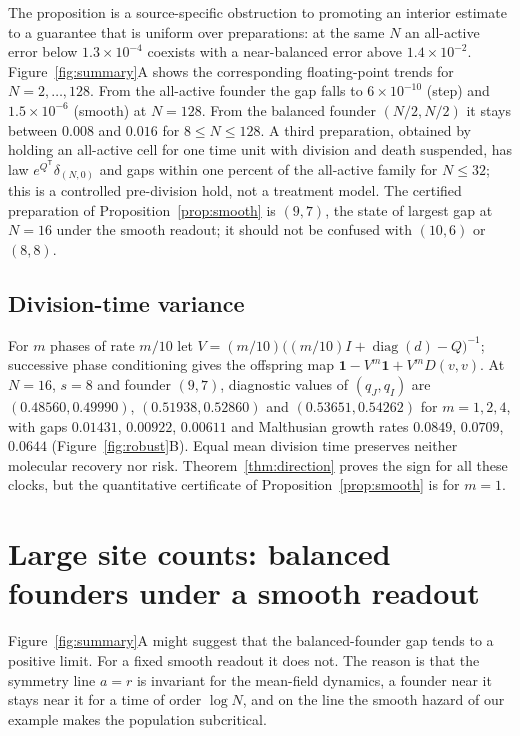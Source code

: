 \documentclass[11pt]{article}
\theoremstyle{remark}
\newcommand{\one}{\mathbf 1}
\newcommand{\diag}{\operatorname{diag}}
\begin{document}
The proposition is a source-specific obstruction to promoting an interior
estimate to a guarantee that is uniform over preparations: at the same $N$ an
all-active error below $1.3\times10^{-4}$ coexists with a near-balanced error
above $1.4\times10^{-2}$. Figure~\ref{fig:summary}A shows the corresponding
floating-point trends for $N=2,\dots,128$. From the all-active founder the
gap falls to $6\times10^{-10}$ (step) and $1.5\times10^{-6}$ (smooth) at
$N=128$. From the balanced founder $(N/2,N/2)$ it stays between $0.008$ and
$0.016$ for $8\le N\le128$. A third preparation, obtained by holding an
all-active cell for one time unit with division and death suspended, has law
$e^{Q^{\mathsf T}}\delta_{(N,0)}$ and gaps within one percent of the
all-active family for $N\le32$; this is a controlled pre-division hold, not a treatment
model. The certified preparation of Proposition~\ref{prop:smooth} is $(9,7)$,
the state of largest gap at $N=16$ under the smooth readout; it should not be confused with $(10,6)$
or $(8,8)$.


\subsection{Division-time variance}
For $m$ phases of rate $m/10$ let $V=(m/10)\bigl((m/10)I+\diag(d)-Q\bigr)^{-1}$;
successive phase conditioning gives the offspring map
$\one-V^m\one+V^mD(v,v)$. At $N=16$, $s=8$ and founder $(9,7)$, diagnostic
values of $(q_J,q_I)$ are $(0.48560,0.49990)$, $(0.51938,0.52860)$ and
$(0.53651,0.54262)$ for $m=1,2,4$, with gaps $0.01431$, $0.00922$, $0.00611$
and Malthusian growth rates $0.0849$, $0.0709$, $0.0644$
(Figure~\ref{fig:robust}B). Equal mean division time preserves neither
molecular recovery nor risk. Theorem~\ref{thm:direction} proves the sign for
all these clocks, but the quantitative certificate of
Proposition~\ref{prop:smooth} is for $m=1$.

\section{Large site counts: balanced founders under a smooth readout}
\label{sec:boundary}

Figure~\ref{fig:summary}A might suggest that the balanced-founder gap tends to
a positive limit. For a fixed smooth readout it does not. The reason is
that the symmetry line $a=r$ is invariant for the mean-field dynamics, a
founder near it stays near it for a time of order $\log N$, and on the line
the smooth hazard of our example makes the population subcritical.
\end{document}
